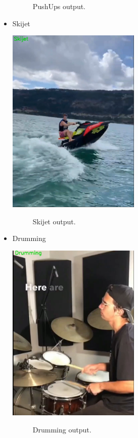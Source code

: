 \begin{itemize}
\begin{figure}[h!]
    	\caption[PushUps output .]{PushUps output.}
    	\label{pushup_conv.png} 
        \end{figure}
        
    \item Skijet

        \includegraphics[width=0.5\textwidth]{Figures/skijet_conv.png}
        \begin{figure}[h!]
    	\centering
    	
    	\caption[Skijet output .]{Skijet output.}
    	\label{skijet_conv.png} 
        \end{figure}

    \item Drumming

        \includegraphics[width=0.5\textwidth]{Figures/drum_conv.png}
        \begin{figure}[h!]
    	\centering
    	
    	\caption[Drumming output .]{Drumming output.}
    	\label{drum_conv.png} 
        \end{figure}
    
\end{itemize}
    


